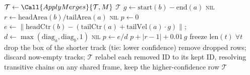 \begin{algorithm}[ht]
\begin{algorithmic}[1]
    \State $\mathcal{T} \gets \Call{ApplyMerges}{\mathcal{T},M}$
  \State \Return $\mathcal{T}$
\EndProcedure
\Statex
{} 
  \State $g \gets \text{start}(b)-\text{end}(a)$
   \Return \textsc{nil} \EndIf
  \State $r \gets \text{headArea}(b)/\text{tailArea}(a)$
   \Return \textsc{nil} \EndIf
  \State $p \gets 0$
  \If{$\rho$} 
    \State $e \gets \lVert \text{headCtr}(b)-(\text{tailCtr}(a)+\text{tailVel}(a)\cdot g)\rVert$;\;\; $d \gets \max(\text{diag}_a,\text{diag}_b,1)$
     \Return \textsc{nil} \EndIf
    \State $p \gets e/d$
  \EndIf
  \State \Return $p + |r-1| + 0.01\,g$
\EndFunction
\Statex
{}
  \State freeze $\text{len}(t)\;\forall t$ 
      \State drop the box of the shorter track (tie: lower confidence)
    \EndFor
  \EndFor
  \State remove dropped rows; discard now-empty tracks; \Return $\mathcal{T}$
\EndProcedure
\Statex
{}
  \State relabel each removed ID to its kept ID, resolving transitive chains
  \State on any shared frame, keep the higher-confidence row 
  \State \Return $\mathcal{T}$
\EndProcedure
\end{algorithmic}
\end{algorithm}
